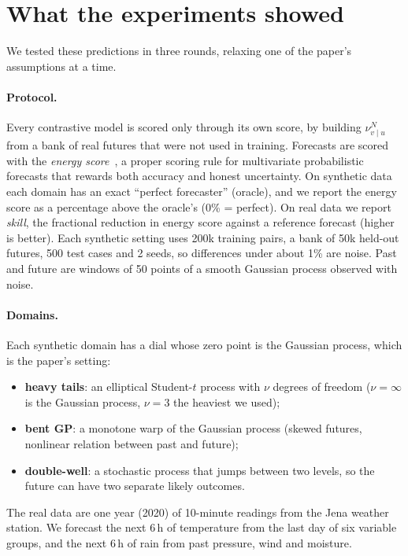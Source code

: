 \documentclass[11pt]{article}
\newcommand{\vu}{{v\mid u}}
\theoremstyle{plain}
\theoremstyle{definition}
\theoremstyle{remark}
\begin{document}
\section{What the experiments showed}\label{sec:evidence}

We tested these predictions in three rounds, relaxing one of the paper's assumptions at a
time.

\paragraph{Protocol.} Every contrastive model is scored only through its own score, by
building $\nu^N_\vu$ from a bank of real futures that were not used in training. Forecasts are
scored with the \emph{energy score}~\cite{gneiting}, a proper scoring rule for
multivariate probabilistic forecasts that rewards both accuracy and honest uncertainty. On
synthetic data each domain has an exact ``perfect forecaster'' (oracle), and we report the
energy score as a percentage above the oracle's (0\% = perfect). On real data we report
\emph{skill}, the fractional reduction in energy score against a reference forecast (higher
is better). Each synthetic setting uses 200k training pairs, a bank of 50k held-out
futures, 500 test cases and 2 seeds, so differences under about 1\% are noise. Past and
future are windows of 50 points of a smooth Gaussian process observed with noise.

\paragraph{Domains.} Each synthetic domain has a dial whose zero point is the Gaussian
process, which is the paper's setting:
\begin{itemize}
\item \textbf{heavy tails}: an elliptical Student-$t$ process with $\nu$ degrees of freedom
  ($\nu=\infty$ is the Gaussian process, $\nu=3$ the heaviest we used);
\item \textbf{bent GP}: a monotone warp of the Gaussian process (skewed futures, nonlinear
  relation between past and future);
\item \textbf{double-well}: a stochastic process that jumps between two levels, so the future
  can have two separate likely outcomes.
\end{itemize}
The real data are one year (2020) of 10-minute readings from the Jena weather station. We
forecast the next 6\,h of temperature from the last day of six variable groups, and the next
6\,h of rain from past pressure, wind and moisture.
\end{document}
